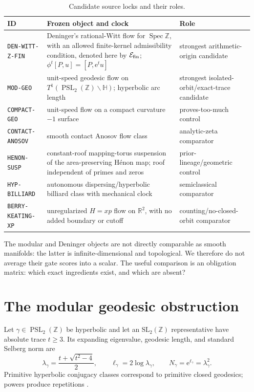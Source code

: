 \documentclass[11pt]{article}
\theoremstyle{definition}
\theoremstyle{remark}
\newcommand{\PSL}{\operatorname{PSL}}
\newcommand{\Spec}{\operatorname{Spec}}
\newcommand{\R}{\mathbb{R}}
\newcommand{\Z}{\mathbb{Z}}
\newcommand{\e}{\mathrm{e}}
\begin{document}
\begin{table}[ht]
\centering
\caption{Candidate source locks and their roles.}
\label{tab:candidates}
\small
\begin{tabular}{p{}p{}p{}}
\toprule
ID & Frozen object and clock & Role\\
\midrule
\texttt{DEN-WITT-Z-FIN} & Deninger's rational-Witt flow for \(\Spec\Z\), with an allowed finite-kernel admissibility condition, denoted here by \(\mathcal E_{\rm fin}\); \(\phi^t[P,u]=[P,\e^t u]\) & strongest arithmetic-origin candidate\\
\texttt{MOD-GEO} & unit-speed geodesic flow on \(T^1(\PSL_2(\Z)\backslash\mathbb H)\); hyperbolic arc length & strongest isolated-orbit/exact-trace candidate\\
\texttt{COMPACT-GEO} & unit-speed flow on a compact curvature \(-1\) surface & proves-too-much control\\
\texttt{CONTACT-ANOSOV} & smooth contact Anosov flow class & analytic-zeta comparator\\
\texttt{HENON-SUSP} & constant-roof mapping-torus suspension of the area-preserving H\'enon map; roof independent of primes and zeros & prior-lineage/geometric control\\
\texttt{HYP-BILLIARD} & autonomous dispersing/hyperbolic billiard class with mechanical clock & semiclassical comparator\\
\texttt{BERRY-KEATING-XP} & unregularized \(H=xp\) flow on \(\R^2\), with no added boundary or cutoff & counting/no-closed-orbit comparator\\
\bottomrule
\end{tabular}
\end{table}

The modular and Deninger objects are not directly comparable as smooth
manifolds: the latter is infinite-dimensional and topological.  We therefore
do not average their gate scores into a scalar.  The useful comparison is an
obligation matrix: which exact ingredients exist, and which are absent?

\section{The modular geodesic obstruction}
\label{sec:modular}

Let \(\gamma\in\PSL_2(\Z)\) be hyperbolic and let an
\(\mathrm{SL}_2(\Z)\) representative have absolute trace \(t\ge3\).  Its
expanding eigenvalue, geodesic length, and standard Selberg norm are
\begin{equation}
 \lambda_\gamma=\frac{t+\sqrt{t^2-4}}{2},\qquad
 \ell_\gamma=2\log\lambda_\gamma,
 \qquad N_\gamma=\e^{\ell_\gamma}=\lambda_\gamma^2.
 \label{eq:modnorm}
\end{equation}
Primitive hyperbolic conjugacy classes correspond to primitive closed
geodesics; powers produce repetitions \citep{PohlZagier2020,Sarnak1982}.
\end{document}
